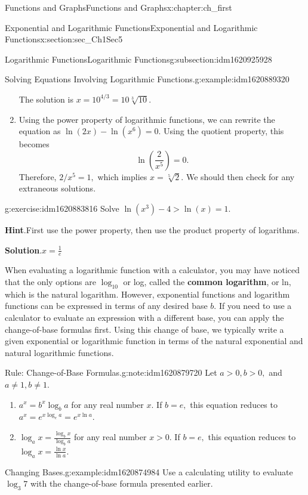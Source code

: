 \documentclass[oneside,10pt,]{book}
\newcommand{\blocktitlefont}{\relax}
\newcommand{\terminology}[1]{\textbf{#1}}
\numberwithin{equation}{section}
\newcommand{\gt}{>}
\begin{document}
\begin{chapterptx}{Functions and Graphs}{}{Functions and Graphs}{}{}{x:chapter:ch_first}
\begin{sectionptx}{Exponential and Logarithmic Functions}{}{Exponential and Logarithmic Functions}{}{}{x:section:sec_Ch1Sec5}
\begin{subsectionptx}{Logarithmic Functions}{}{Logarithmic Functions}{}{}{g:subsection:idm1620925928}
\begin{example}{Solving Equations Involving Logarithmic Functions.}{g:example:idm1620889320}
\begin{enumerate}
The solution is \(x=10^{4/3}=10\sqrt[3]{10}.\)%
\item{}Using the power property of logarithmic functions, we can rewrite the equation as \(\ln(2x)-\ln(x^6)=0.\) Using the quotient property, this becomes%
\begin{equation*}
\ln\left(\frac{2}{x^5}\right)=0.
\end{equation*}
Therefore, \(2/x^5=1,\) which implies \(x=\sqrt[5]{2}.\) We should then check for any extraneous solutions.%
\end{enumerate}
\end{example}
\begin{inlineexercise}{}{g:exercise:idm1620883816}%
Solve \(\ln(x^3)-4>\ln(x)=1.\)%
\par\smallskip%
\noindent\textbf{\blocktitlefont Hint}.\hypertarget{g:hint:idm1620881768}{}\quad{}First use the power property, then use the product property of logarithms.%
\par\smallskip%
\noindent\textbf{\blocktitlefont Solution}.\hypertarget{g:solution:idm1620880616}{}\quad{}\(x=\frac{1}{e}\)%
\end{inlineexercise}%
When evaluating a logarithmic function with a calculator, you may have noticed that the only options are \(\log_{10}\) or log, called the \terminology{common logarithm}, or ln, which is the natural logarithm. However, exponential functions and logarithm functions can be expressed in terms of any desired base \(b.\) If you need to use a calculator to evaluate an expression with a different base, you can apply the change-of-base formulas first. Using this change of base, we typically write a given exponential or logarithmic function in terms of the natural exponential and natural logarithmic functions.%
\begin{note}{Rule: Change-of-Base Formulas.}{g:note:idm1620879720}%
Let \(a\gt 0,b\gt 0,\) and \(a\neq 1,b\neq 1.\)%
%
\begin{enumerate}
\item{}\(a^x=b^x{\log_b a}\) for any real number \(x.\) If \(b=e,\) this equation reduces to \(a^x=e^{x\log_e a}=e^{x\ln a}.\)%
\item{}\(\log_a x=\frac{\log_b x}{\log_b a}\) for any real number \(x\gt 0.\) If \(b=e,\) this equation reduces to \(\log_a x=\frac{\ln x}{\ln a}.\)%
\end{enumerate}
\end{note}
\begin{example}{Changing Bases.}{g:example:idm1620874984}%
Use a calculating utility to evaluate \(\log_{3}7\) with the change-of-base formula presented earlier.%

\end{example}
\end{subsectionptx}
\end{sectionptx}
\end{chapterptx}
\end{document}
